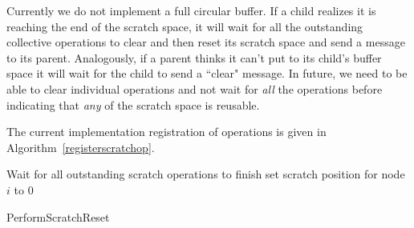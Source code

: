 \documentclass[times,10pt]{article}
\begin{document}
Currently we do not implement a full circular buffer.  If a child realizes it is reaching the end of the scratch space, it will wait for all the outstanding collective operations to clear and then reset its scratch space and send a message to its parent. Analogously, if a parent thinks it can't put to its child's buffer space it will wait for the child to send a ``clear" message. In future, we need to be able to clear individual operations and not wait for \textit{all} the operations before indicating that \textit{any} of the scratch space is reusable. 

The current implementation registration of operations is given in Algorithm~\ref{registerscratchop}.

\begin{algorithm}[h]
\begin{algorithmic}[1]
\STATE Wait for all outstanding scratch operations to finish
\STATE set scratch position for node $i$ to $0$
\ENDFOR
\end{algorithmic}
\caption{PerformScratchReset}
\label{registerscratchop}
\end{algorithm}
\end{document}
